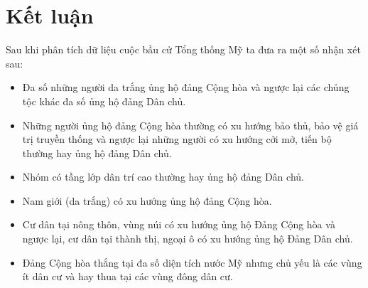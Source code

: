 \documentclass[14pt, a4paper]{article}
\numberwithin{equation}{section}
\numberwithin{figure}{section}
\numberwithin{dl}{section}
\numberwithin{md}{section}
\numberwithin{bd}{section}
\numberwithin{dn}{section}
\numberwithin{hq}{section}
\begin{document}
    \section{Kết luận}

    Sau khi phân tích dữ liệu cuộc bầu cử Tổng thống Mỹ ta đưa ra một số nhận xét sau:

    \begin{itemize}
        \item Đa số những người da trắng ủng hộ đảng Cộng hòa và ngược lại các chủng tộc khác đa số ủng hộ đảng Dân chủ.
        \item Những người ủng hộ đảng Cộng hòa thường có xu hướng bảo thủ, bảo vệ giá trị truyền thống và ngược lại những người có xu hướng cởi mở, tiến bộ thường hay ủng hộ đảng Dân chủ.
        \item Nhóm có tầng lớp dân trí cao thường hay ủng hộ đảng Dân chủ.
        \item Nam giới (da trắng) có xu hướng ủng hộ đảng Cộng hòa.
        \item Cư dân tại nông thôn, vùng núi có xu hướng ủng hộ Đảng Cộng hòa và ngược lại, cư dân tại thành thị, ngoại ô có xu hướng ủng hộ Đảng Dân chủ.
        \item Đảng Cộng hòa thắng tại đa số diện tích nước Mỹ nhưng chủ yếu là các vùng ít dân cư và hay thua tại các vùng đông dân cư.
    \end{itemize}

    \newpage
    \printbibliography[title={TÀI LIỆU THAM KHẢO}]
\end{document}
